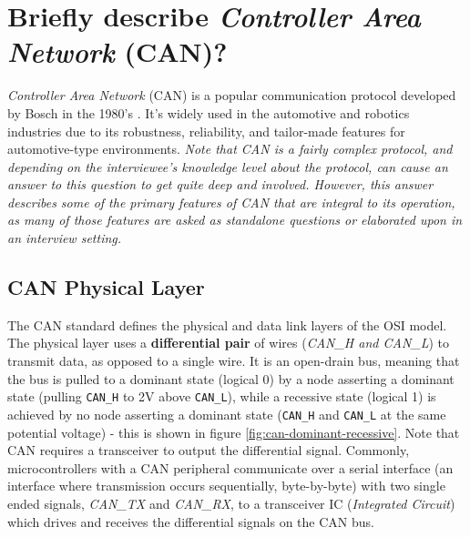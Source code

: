 \documentclass[main.tex]{subfiles}
\begin{document}
\section{Briefly describe \textit{Controller Area Network} (CAN)?}

\spoilerline
\noindent \textit{Controller Area Network} (CAN) is a popular communication protocol developed by Bosch in the 1980's \cite{cadence_canbus_history}. It's widely used in the automotive and robotics industries due to its robustness, reliability, and tailor-made features for automotive-type environments.\newline
\newnoindentpara \textit{Note that CAN is a fairly complex protocol, and depending on the interviewee's knowledge level about the protocol, can cause an answer to this question to get quite deep and involved. However, this answer describes some of the primary features of CAN that are integral to its operation, as many of those features are asked as standalone questions or elaborated upon in an interview setting.} \newline

\subsection{CAN Physical Layer}
The CAN standard defines the physical and data link layers of the OSI model. The physical layer uses a \textbf{differential pair} of wires (\textit{CAN\_H and CAN\_L}) to transmit data, as opposed to a single wire. It is an open-drain bus, meaning that the bus is pulled to a dominant state (logical 0) by a node asserting a dominant state (pulling \texttt{CAN\_H} to 2V above \texttt{CAN\_L}), while a recessive state (logical 1) is achieved by no node asserting a dominant state (\texttt{CAN\_H} and \texttt{CAN\_L} at the same potential voltage) - this is shown in figure \ref{fig:can-dominant-recessive}. Note that CAN requires a transceiver to output the differential signal. Commonly, microcontrollers with a CAN peripheral communicate over a serial interface (an interface where transmission occurs sequentially, byte-by-byte) with two single ended signals, \textit{CAN\_TX} and \textit{CAN\_RX}, to a transceiver IC (\textit{Integrated Circuit}) which drives and receives the differential signals on the CAN bus. 
\end{document}
